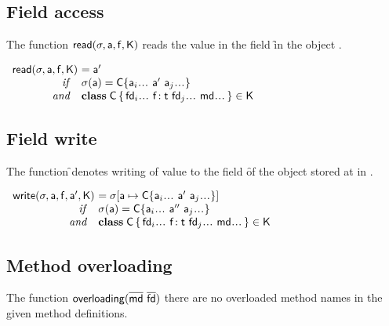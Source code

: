 \documentclass[acmlarge, anonymous, authordraft]{acmart}
\begin{document}
\subsection{Field access}

The function $\readf\s\a\f\K$ reads the value in the field \f in the object \a.

\(
\begin{array}{r@{~}l}
\readf \s\a\f\K &= \ap\\ 
    ~~\mathit{if}~~ &\s(\a) = \obj\C{\a_i \dots ~\ap~ \a_j \dots}\\
    ~~\mathit{and}~~ &\Class\C {\fd_i \dots ~\Fdef{\f}{\t}~ \fd_j \dots}{\md \dots}\in\K \\
\end{array} 
\)

\subsection{Field write}

The function \setf\s\a\f\ap\K denotes writing of value \ap to the field \f of
the object stored at \a in \s.


\(
\begin{array}{r@{~}l}
\setf \s\a\f\ap\K &= \Map\s{\Bind{\a}{\obj\C{\a_i\dots ~\ap~ \a_j\dots}}}\\
  ~~\mathit{if}~~ &\s(\a) = \obj\C{\a_i\dots ~\app~ \a_j\dots} \\
  ~~\mathit{and}~~&\Class\C{\fd_i \dots ~\Fdef{\f}{\t}~ \fd_j\dots}{\md \dots}\in\K
\end{array}
\)

\subsection{Method overloading}

The function $\xt{overloading}(\b\md ~ \b\fd)$ there are no overloaded method names in the
given method definitions.


\begin{mathpar}


\end{mathpar}
\end{document}

